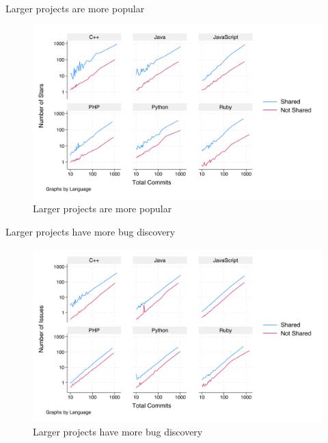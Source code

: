 \documentclass[
  ignorenonframetext,
  aspectratio=1610,
]{beamer}
\begin{document}
\begin{frame}{Larger projects are more popular}
\label{larger-projects-are-more-popular}
\begin{figure}
\centering
\includegraphics{figures/n_stars_by_commits.png}
\caption{Larger projects are more popular}
\end{figure}
\end{frame}

\begin{frame}{Larger projects have more bug discovery}
\label{larger-projects-have-more-bug-discovery}
\begin{figure}
\centering
\includegraphics{figures/n_issues_by_commits.png}
\caption{Larger projects have more bug discovery}
\end{figure}
\end{frame}
\end{document}
